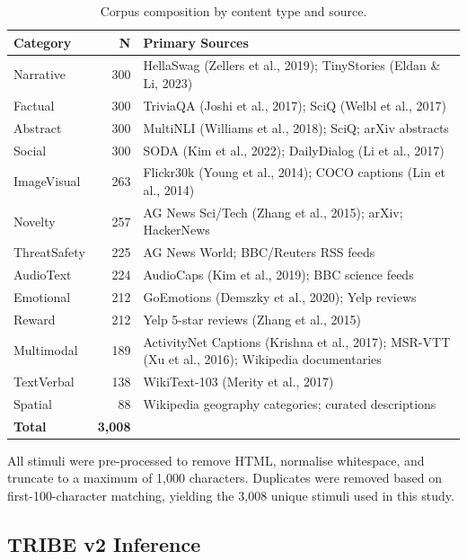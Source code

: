 \documentclass[11pt,letterpaper]{article}
\numberwithin{equation}{section}
\begin{document}
\begin{table}[ht]
\centering
\small
\caption{Corpus composition by content type and source.}
\label{tab:corpus}
\begin{tabular}{l r p{8cm}}
\toprule
\textbf{Category} & \textbf{N} & \textbf{Primary Sources} \\
\midrule
Narrative      & 300 & HellaSwag (Zellers et al., 2019); TinyStories (Eldan \& Li, 2023) \\
Factual        & 300 & TriviaQA (Joshi et al., 2017); SciQ (Welbl et al., 2017) \\
Abstract       & 300 & MultiNLI (Williams et al., 2018); SciQ; arXiv abstracts \\
Social         & 300 & SODA (Kim et al., 2022); DailyDialog (Li et al., 2017) \\
ImageVisual    & 263 & Flickr30k (Young et al., 2014); COCO captions (Lin et al., 2014) \\
Novelty        & 257 & AG News Sci/Tech (Zhang et al., 2015); arXiv; HackerNews \\
ThreatSafety   & 225 & AG News World; BBC/Reuters RSS feeds \\
AudioText      & 224 & AudioCaps (Kim et al., 2019); BBC science feeds \\
Emotional      & 212 & GoEmotions (Demszky et al., 2020); Yelp reviews \\
Reward         & 212 & Yelp 5-star reviews (Zhang et al., 2015) \\
Multimodal     & 189 & ActivityNet Captions (Krishna et al., 2017); MSR-VTT (Xu et al., 2016); Wikipedia documentaries \\
TextVerbal     & 138 & WikiText-103 (Merity et al., 2017) \\
Spatial        &  88 & Wikipedia geography categories; curated descriptions \\
\midrule
\textbf{Total} & \textbf{3{,}008} & \\
\bottomrule
\end{tabular}
\end{table}

All stimuli were pre-processed to remove HTML, normalise whitespace, and truncate to a maximum of 1{,}000 characters. Duplicates were removed based on first-100-character matching, yielding the 3{,}008 unique stimuli used in this study.

\subsection{TRIBE v2 Inference}
\end{document}
